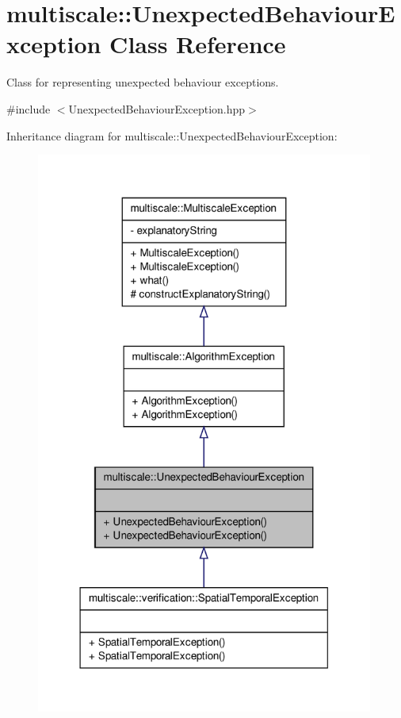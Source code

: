 \hypertarget{classmultiscale_1_1UnexpectedBehaviourException}{\section{multiscale\-:\-:\-Unexpected\-Behaviour\-Exception \-Class \-Reference}
\label{classmultiscale_1_1UnexpectedBehaviourException}
}


\-Class for representing unexpected behaviour exceptions.  




{\ttfamily \#include $<$\-Unexpected\-Behaviour\-Exception.\-hpp$>$}



\-Inheritance diagram for multiscale\-:\-:\-Unexpected\-Behaviour\-Exception\-:\nopagebreak
\begin{figure}[H]
\begin{center}
\leavevmode
\includegraphics[width=314pt]{classmultiscale_1_1UnexpectedBehaviourException__inherit__graph}
\end{center}
\end{figure}
